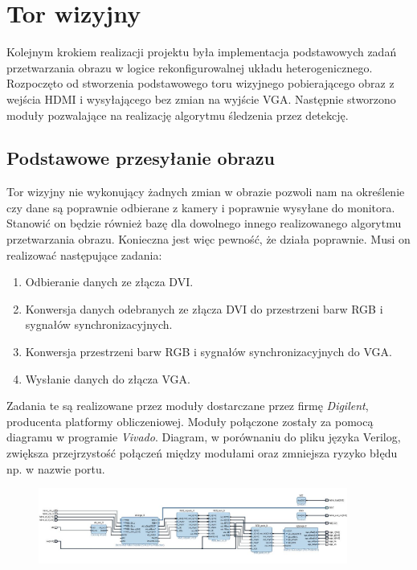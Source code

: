 \chapter{Tor wizyjny}
\label{cha:torwizyjny}

Kolejnym krokiem realizacji projektu była implementacja podstawowych zadań przetwarzania obrazu w logice rekonfigurowalnej układu heterogenicznego. Rozpoczęto od stworzenia podstawowego toru wizyjnego pobierającego obraz z wejścia HDMI i wysyłającego bez zmian na wyjście VGA. Następnie stworzono moduły pozwalające na realizację algorytmu śledzenia przez detekcję.

\section{Podstawowe przesyłanie obrazu}
\label{sec:podstawoweprzesylanieobrazu}
Tor wizyjny nie wykonujący żadnych zmian w obrazie pozwoli nam na określenie czy dane są poprawnie odbierane z kamery i poprawnie wysyłane do monitora. Stanowić on będzie również bazę dla dowolnego innego realizowanego algorytmu przetwarzania obrazu. Konieczna jest więc pewność, że działa poprawnie. Musi on realizować następujące zadania:
\begin{enumerate}
\item Odbieranie danych ze złącza DVI.
\item Konwersja danych odebranych ze złącza DVI do przestrzeni barw RGB i sygnałów synchronizacyjnych.
\item Konwersja przestrzeni barw RGB i sygnałów synchronizacyjnych do VGA.
\item Wysłanie danych do złącza VGA.
\end{enumerate}
Zadania te są realizowane przez moduły dostarczane przez firmę \textit{Digilent}, producenta platformy obliczeniowej. Moduły połączone zostały za pomocą diagramu w programie \textit{Vivado}. Diagram, w porównaniu do pliku języka Verilog, zwiększa przejrzystość połączeń między modułami oraz zmniejsza ryzyko błędu np. w nazwie portu.

\begin{figure}[h]
	\centering
	\includegraphics[width=4in]{Tor_wizyjny.jpg}
\end{figure}


